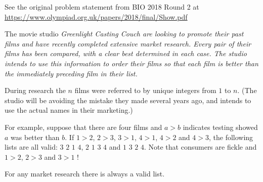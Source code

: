 \begin{center}\small{
    See the original problem statement from BIO 2018 Round 2 at
    \url{https://www.olympiad.org.uk/papers/2018/final/Show.pdf}
}\end{center}

The movie studio \it{Greenlight Casting Couch} are looking to promote their past
films and have recently completed extensive market research. Every pair of their
films has been compared, with a clear best determined in each case. The studio
intends to use this information to order their films so that each film is better than
the \it{immediately} preceding film in their list.

During research the $n$ films were referred to by unique integers from $1$ to $n$.
(The studio will be avoiding the mistake they made several years ago, and intends
to use the actual names in their marketing.)

For example, suppose that there are four films and $a>b$ indicates testing
showed $a$ was better than $b$. If $1>2$, $2>3$, $3>1$, $4>1$, $4>2$ and $4>3$, the following
lists are all valid: $3$ $2$ $1$ $4$, $2$ $1$ $3$ $4$ and $1$ $3$ $2$ $4$.
Note that consumers are fickle and $1>2$, $2>3$ and $3>1$ !

For any market research there is always a valid list.
